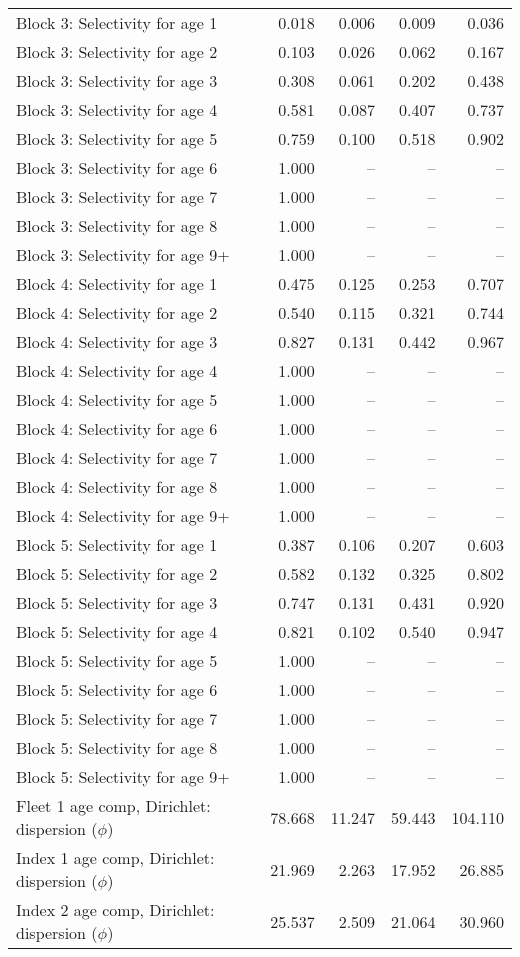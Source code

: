 \documentclass[
]{article}
\begin{document}
\begin{landscape}
\begin{longtable}[t]{lrrrr}
\addlinespace
Block 3: Selectivity for age 1 & 0.018 & 0.006 & 0.009 & 0.036\\
Block 3: Selectivity for age 2 & 0.103 & 0.026 & 0.062 & 0.167\\
Block 3: Selectivity for age 3 & 0.308 & 0.061 & 0.202 & 0.438\\
Block 3: Selectivity for age 4 & 0.581 & 0.087 & 0.407 & 0.737\\
Block 3: Selectivity for age 5 & 0.759 & 0.100 & 0.518 & 0.902\\
\addlinespace
Block 3: Selectivity for age 6 & 1.000 & -- & -- & --\\
Block 3: Selectivity for age 7 & 1.000 & -- & -- & --\\
Block 3: Selectivity for age 8 & 1.000 & -- & -- & --\\
Block 3: Selectivity for age 9+ & 1.000 & -- & -- & --\\
Block 4: Selectivity for age 1 & 0.475 & 0.125 & 0.253 & 0.707\\
\addlinespace
Block 4: Selectivity for age 2 & 0.540 & 0.115 & 0.321 & 0.744\\
Block 4: Selectivity for age 3 & 0.827 & 0.131 & 0.442 & 0.967\\
Block 4: Selectivity for age 4 & 1.000 & -- & -- & --\\
Block 4: Selectivity for age 5 & 1.000 & -- & -- & --\\
Block 4: Selectivity for age 6 & 1.000 & -- & -- & --\\
\addlinespace
Block 4: Selectivity for age 7 & 1.000 & -- & -- & --\\
Block 4: Selectivity for age 8 & 1.000 & -- & -- & --\\
Block 4: Selectivity for age 9+ & 1.000 & -- & -- & --\\
Block 5: Selectivity for age 1 & 0.387 & 0.106 & 0.207 & 0.603\\
Block 5: Selectivity for age 2 & 0.582 & 0.132 & 0.325 & 0.802\\
\addlinespace
Block 5: Selectivity for age 3 & 0.747 & 0.131 & 0.431 & 0.920\\
Block 5: Selectivity for age 4 & 0.821 & 0.102 & 0.540 & 0.947\\
Block 5: Selectivity for age 5 & 1.000 & -- & -- & --\\
Block 5: Selectivity for age 6 & 1.000 & -- & -- & --\\
Block 5: Selectivity for age 7 & 1.000 & -- & -- & --\\
\addlinespace
Block 5: Selectivity for age 8 & 1.000 & -- & -- & --\\
Block 5: Selectivity for age 9+ & 1.000 & -- & -- & --\\
Fleet 1 age comp, Dirichlet: dispersion ($\phi$) & 78.668 & 11.247 & 59.443 & 104.110\\
Index 1 age comp, Dirichlet: dispersion ($\phi$) & 21.969 & 2.263 & 17.952 & 26.885\\
Index 2 age comp, Dirichlet: dispersion ($\phi$) & 25.537 & 2.509 & 21.064 & 30.960\\*
\end{longtable}
\end{landscape}
\end{document}
